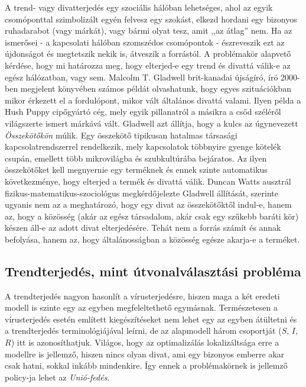   A trend- vagy divatterjedés egy szociális hálóban lehetséges, ahol az egyik csomóponttal szimbolizált egyén felvesz egy szokást, elkezd hordani egy bizonyos ruhadarabot (vagy márkát), vagy bármi olyat tesz, amit ,,az átlag'' nem. Ha az ismerősei - a kapcsolati hálóban szomszédos csomópontok - észreveszik ezt az újdonságot és megtetszik nekik is, átveszik a forrástól. A problémakör alapvető kérdése, hogy mi határozza meg, hogy elterjed-e egy trend és divattá válik-e az egész hálózatban, vagy sem. Malcolm T. Gladwell brit-kanadai újságíró, író 2000-ben megjelent könyvében \cite{The_Tipping_Point} számos példát olvashatunk, hogy egyes szituációkban mikor érkezett el a fordulópont, mikor vált általános divattá valami. Ilyen példa a Hush Puppy cipőgyártó cég, mely egyik pillanatról a másikra a csőd széléről világszerte ismert márkává vált. Gladwell azt állítja, hogy a kulcs az úgynevezett \emph{Összekötőkön} múlik. Egy összekötő tipikusan hatalmas társasági kapcsolatrendszerrel rendelkezik, mely kapcsolatok többnyire gyenge kötelék csupán, emellett több mikrovilágba és szubkultúrába bejáratos. Az ilyen összekötőket kell megnyernie egy terméknek és ennek szinte automatikus következménye, hogy elterjed a termék és divattá válik. Duncan Watts ausztrál fizikus-matematikus-szociológus megkérdőjelezte Gladwell állítását, szerinte ugyanis nem az a meghatározó, hogy egy divat az összekötőktől indul-e, hanem az, hogy a közösség (akár az egész társadalom, akár csak egy szűkebb baráti kör) készen áll-e az adott divat elterjedésére. Tehát nem a forrás számít és annak befolyása, hanem az, hogy általánosságban a közösség egésze akarja-e a terméket.\\

    \subsection{Trendterjedés, mint útvonalválasztási probléma}

    A trendterjedés nagyon hasonlít a vírusterjedésre, hiszen maga a két eredeti modell is szinte egy az egyben megfeleltethető egymásnak. Természetesen a vírusterjedés esetén említett kiegészítéseket nem lehet egy az egyben átültetni és a trendterjedés terminológiájával leírni, de az alapmodell három csoportját ($S$, $I$, $R$) itt is azonosíthatjuk. Világos, hogy az optimalizálás lokalizáltsága erre a modellre is jellemző, hiszen nincs olyan divat, ami egy bizonyos emberre akar csak hatni, sokkal inkább mindenkire. Így ennek a problémakörnek is jellemző policy-ja lehet az \emph{Unió-fedés}.

